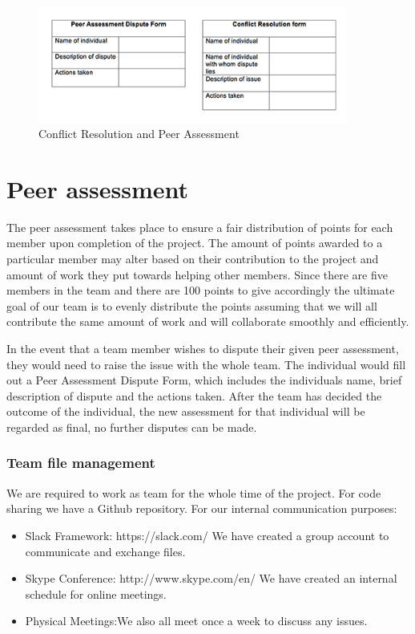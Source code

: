 \documentclass[oneside]{article}
\begin{document}
\begin{figure}[h]
\centering
\includegraphics[width=4in]{both}
\caption{Conflict Resolution and Peer Assessment}
\end{figure}

\section{Peer assessment}
\noindent The peer assessment takes place to ensure a fair distribution of points for each member upon completion of the project. The amount of points awarded to a particular member may alter based on their contribution to the project and amount of work they put towards helping other members. Since there are five members in the team and there are 100 points to give accordingly the ultimate goal of our team is to evenly distribute the points assuming that we will all contribute the same amount of work and will collaborate smoothly and efficiently.
\newline

\noindent In the event that a team member wishes to dispute their given peer assessment, they would need to raise the issue with the whole team. The individual would fill out a Peer Assessment Dispute Form, which includes the individuals name, brief description of dispute and the actions taken. After the team has decided the outcome of the individual, the new assessment for that individual will be regarded as final, no further disputes can be made. 

\subsubsection{Team file management}
We are required to work as team for the whole time of the project. For code sharing we have a Github repository.
For our internal communication purposes: 
 \begin{itemize}
  \item Slack Framework: https://slack.com/ We have created a group account to communicate and exchange files. 
  \item Skype Conference: http://www.skype.com/en/ We have created an internal schedule for online meetings. 
  \item Physical Meetings:We also all meet once a week to discuss any issues.  
 \end{itemize}
\end{document}
